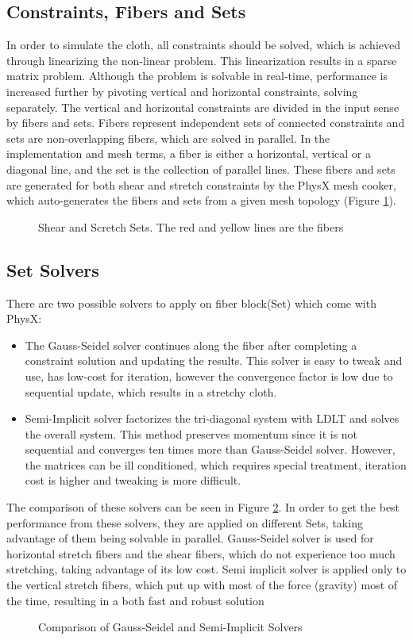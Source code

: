 \subsection{Constraints, Fibers and Sets}
In order to simulate the cloth, all constraints should be solved, which is achieved through linearizing the non-linear problem. This linearization results in a sparse matrix
 problem. Although the problem is solvable in real-time, performance is increased further by pivoting vertical and horizontal constraints, solving separately. The vertical and
  horizontal constraints are divided in the input sense by fibers and sets. Fibers represent independent sets of connected constraints and sets are non-overlapping fibers, which
   are solved in parallel. In the implementation and mesh terms, a fiber is either a horizontal, vertical or a diagonal line, and the set is the collection of parallel lines. 
   These fibers and sets are generated for both shear and stretch constraints by the PhysX mesh cooker, which auto-generates the fibers and sets from a given mesh topology 
   (Figure \ref{fig:shear_strech_sets}). 

\begin{figure}[h]
\centerline{}
\caption{Shear and Scretch Sets. The red and yellow lines are the fibers \cite{Kim2011}}
\label{fig:shear_strech_sets}
\end{figure}

\subsection{Set Solvers}
There are two possible solvers to apply on fiber block(Set) which come with PhysX:
\begin{itemize}
  \item The Gauss-Seidel solver continues along the fiber after completing a constraint solution and updating the results. This solver is easy to tweak and use, 
  has low-cost for iteration, however the convergence factor is low due to sequential update, which results in a stretchy cloth.
  \item Semi-Implicit solver factorizes the tri-diagonal system with LDLT and solves the overall system. This method preserves momentum since it is not sequential and converges
   ten times more than Gauss-Seidel solver. However, the matrices can be ill conditioned, which requires special treatment, iteration cost is higher and tweaking is more difficult.
\end{itemize}
The comparison of these solvers can be seen in Figure \ref{fig:solver_comparison}. In order to get the best performance from these solvers, they are applied on different Sets,
 taking advantage of them being solvable in parallel. Gauss-Seidel solver is used for horizontal stretch fibers and the shear fibers, which do not experience too much stretching,
  taking advantage of its low cost. Semi implicit solver is applied only to the vertical stretch fibers, which put up with most of the force (gravity) most of the time,
   resulting in a both fast and robust solution

\begin{figure}[h]
\centerline{}
\caption{Comparison of Gauss-Seidel and Semi-Implicit Solvers \cite{Kim2011}}
\label{fig:solver_comparison}
\end{figure}


